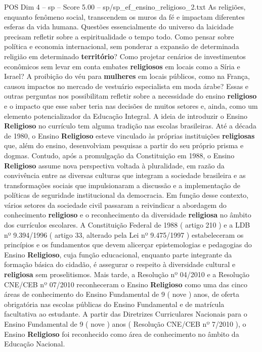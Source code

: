 \begin{textsample}{POS Dim 4 – sp – Score 5.00 – sp/sp\_ef\_ensino\_religioso\_2.txt}  \label{ex:f4_pos_258}
As religiões, enquanto fenômeno social, transcendem os muros da fé e impactam diferentes esferas da vida humana.
Questões essencialmente do universo da laicidade precisam refletir sobre a espiritualidade o tempo todo.
Como pensar sobre política e economia internacional, sem ponderar a expansão de determinada religião em determinado \textbf{território}?
Como projetar cenários de investimentos econômicos sem levar em conta embates \textbf{religiosos} em locais como a Síria e Israel?
A proibição do véu para \textbf{mulheres} em locais públicos, como na França, causou impactos no mercado de vestuário especialista em moda árabe?
Essas e outras perguntas nos possibilitam refletir sobre a necessidade do ensino \textbf{religioso} e o impacto que esse saber teria nas decisões de muitos setores e, ainda, como um elemento potencializador da Educação Integral.
A ideia de introduzir o Ensino \textbf{Religioso} no currículo tem alguma tradição nas escolas brasileiras.
Até a década de 1980, o Ensino \textbf{Religioso} esteve vinculado às próprias instituições \textbf{religiosas} que, além do ensino, desenvolviam pesquisas a partir do seu próprio prisma e dogmas.
Contudo, após a promulgação da Constituição em 1988, o Ensino \textbf{Religioso} assume nova perspectiva voltada à pluralidade, em razão da convivência entre as diversas culturas que integram a sociedade brasileira e as transformações sociais que impulsionaram a discussão e a implementação de políticas de seguridade institucional da democracia.
Em função desse contexto, vários setores da sociedade civil passaram a reivindicar a abordagem do conhecimento \textbf{religioso} e o reconhecimento da diversidade \textbf{religiosa} no âmbito dos currículos escolares.
A Constituição Federal de 1988 ( artigo 210 ) e a LDB nº 9.394/1996 ( artigo 33, alterado pela Lei nº 9.475/1997 ) estabeleceram os princípios e os fundamentos que devem alicerçar epistemologias e pedagogias do Ensino \textbf{Religioso}, cuja função educacional, enquanto parte integrante da formação básica do cidadão, é assegurar o respeito à diversidade cultural e \textbf{religiosa} sem proselitismos.
Mais tarde, a Resolução nº 04/2010 e a Resolução CNE/CEB nº 07/2010 reconheceram o Ensino \textbf{Religioso} como uma das cinco áreas de conhecimento do Ensino Fundamental de 9 ( nove ) anos, de oferta obrigatória nas escolas públicas do Ensino Fundamental e de matrícula facultativa ao estudante.
A partir das Diretrizes Curriculares Nacionais para o Ensino Fundamental de 9 ( nove ) anos ( Resolução CNE/CEB nº 7/2010 ), o Ensino \textbf{Religioso} foi reconhecido como área de conhecimento no âmbito da Educação Nacional.

\end{textsample}
